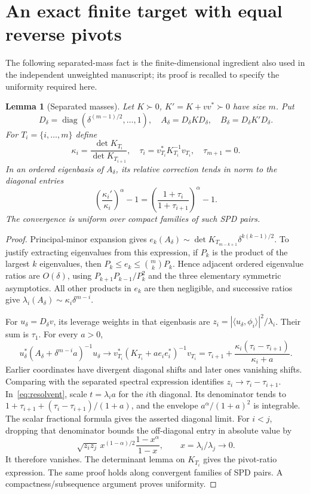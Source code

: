 \documentclass[11pt]{article}
\newtheorem{lemma}[theorem]{Lemma}
\newcommand{\diag}{\operatorname{diag}}
\begin{document}
\section{An exact finite target with equal reverse pivots}
The following separated-mass fact is the finite-dimensional ingredient
also used in the independent unweighted manuscript; its proof is
recalled to specify the uniformity required here.

\begin{lemma}[Separated masses]\label{lem:masses}
Let $K\succ0$, $K'=K+vv^*\succ0$ have size $m$. Put
\[
 D_\delta=\diag(\delta^{(m-1)/2},\ldots,1),\quad
 A_\delta=D_\delta K D_\delta,\quad B_\delta=D_\delta K'D_\delta.
\]
For $T_i=\{i,\ldots,m\}$ define
\[
 \kappa_i=\frac{\det K_{T_i}}{\det K_{T_{i+1}}},\quad
 \tau_i=v_{T_i}^*K_{T_i}^{-1}v_{T_i},\quad\tau_{m+1}=0.
\]
In an ordered eigenbasis of $A_\delta$, its relative correction tends
in norm to the diagonal entries
\[
 \left(\frac{\kappa_i'}{\kappa_i}\right)^\alpha-1
          =\left(\frac{1+\tau_i}{1+\tau_{i+1}}\right)^\alpha-1.
\]
The convergence is uniform over compact families of such SPD pairs.
\end{lemma}
\begin{proof}
Principal-minor expansion gives
$e_k(A_\delta)\sim\det K_{T_{m-k+1}}\delta^{k(k-1)/2}$.
To justify extracting eigenvalues from this expression, if $P_k$ is
the product of the largest $k$ eigenvalues, then
$P_k\le e_k\le\binom mkP_k$. Hence adjacent ordered eigenvalue
ratios are $O(\delta)$, using
$P_{k+1}P_{k-1}/P_k^2$ and the three elementary symmetric asymptotics.
All other products in $e_k$ are then negligible, and successive ratios
give $\lambda_i(A_\delta)\sim\kappa_i\delta^{m-i}$.

For $u_\delta=D_\delta v$, its leverage weights in that eigenbasis
are $z_i=|\langle u_\delta,\phi_i\rangle|^2/\lambda_i$.
Their sum is $\tau_1$. For every $a>0$,
\[
 u_\delta^*(A_\delta+\delta^{m-i}a)^{-1}u_\delta
   \longrightarrow v_{T_i}^*(K_{T_i}+ae_ie_i^*)^{-1}v_{T_i}
   =\tau_{i+1}+\frac{\kappa_i(\tau_i-\tau_{i+1})}{\kappa_i+a}.
\]
Earlier coordinates have divergent diagonal shifts and later ones
vanishing shifts. Comparing with the separated spectral expression
identifies $z_i\to\tau_i-\tau_{i+1}$.
In~\eqref{eq:resolvent}, scale $t=\lambda_i a$ for the $i$th diagonal.
Its denominator tends to
$1+\tau_{i+1}+(\tau_i-\tau_{i+1})/(1+a)$, and the envelope
$a^\alpha/(1+a)^2$ is integrable. The scalar fractional formula gives
the asserted diagonal limit. For $i<j$, dropping that denominator
bounds the off-diagonal entry in absolute value by
\[
 \sqrt{z_i z_j}\,x^{(1-\alpha)/2}\frac{1-x^\alpha}{1-x},
                     \qquad x=\lambda_i/\lambda_j\to0.
\]
It therefore vanishes. The determinant lemma on $K_{T_i}$ gives the
pivot-ratio expression. The same proof holds along convergent families
of SPD pairs. A compactness/subsequence argument proves uniformity.
\end{proof}
\end{document}
